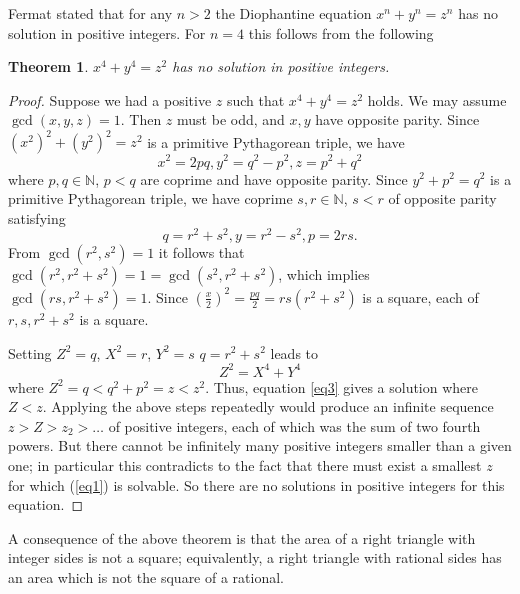 \documentclass[12pt]{article}
\newcommand{\N}{{\mathbb N}}
\newtheorem{theorem}{Theorem}
\begin{document}
Fermat stated that for any $n > 2$ the Diophantine equation $x^n+y^n=z^n$ has no solution in positive integers. For $n=4$ this follows from the following
\begin{theorem}
$x^4+y^4 =z^2$ has no solution in positive integers.
\end{theorem}
\begin{proof}
Suppose we had a positive $z$ such that $x^4+y^4=z^2$ holds. We may assume $\gcd(x,y,z)=1$. Then $z$ must be odd, and $x,y$ have opposite parity. Since $(x^2)^2 +(y^2)^2 =z^2$ is a primitive Pythagorean triple, we have
\begin{equation}
\label{eq1}
x^2=2pq, y^2 =q^2-p^2, z=p^2+q^2
\end{equation}
where $p,q \in \N$, $p<q$ are coprime and have opposite parity. Since $y^2+p^2=q^2$ is a primitive Pythagorean triple, we have coprime $s,r \in \N$, $s<r$ of opposite parity satisfying
\begin{equation}
\label{eq2}
q=r^2+s^2, y=r^2-s^2, p=2rs.
\end{equation}
From $\gcd(r^2, s^2)=1$ it follows that $\gcd(r^2, r^2+s^2)=1=\gcd(s^2, r^2+s^2)$, which implies $\gcd(rs, r^2+s^2)=1$. Since $\left(\frac{x}{2}\right)^2 = \frac{pq}{2} = rs(r^2+s^2)$ is a square, each of $r,s,r^2+s^2$ is a square.

Setting $Z^2 =q$, $X^2 =r$, $Y^2=s$ $q=r^2+s^2$ leads to
\begin{equation}
\label{eq3}
Z^2=X^4+Y^4
\end{equation}
where $Z^2=q<q^2+p^2=z <z^2$. Thus, equation \ref{eq3} gives a solution where $Z< z$. Applying the above steps repeatedly would produce an infinite sequence $z > Z > z_2 > \ldots$ of positive integers, each of which was the sum of two fourth powers. But there cannot be infinitely many positive integers smaller than a given one; in particular this contradicts to the fact that there must exist a smallest $z$ for which (\ref{eq1}) is solvable. So there are no solutions in positive integers for this equation.
\end{proof}

A consequence of the above theorem is that the area of a right triangle with integer sides is not a square; equivalently, a right triangle with rational sides has an area which is not the square of a rational.
\end{document}
